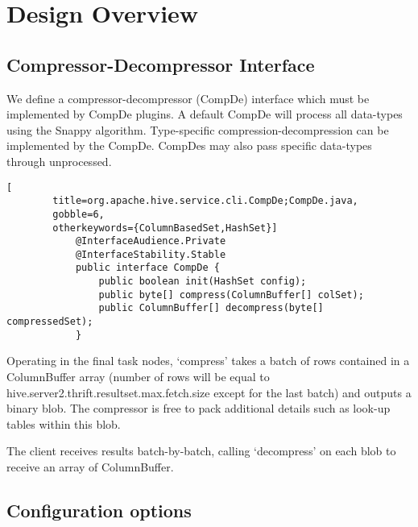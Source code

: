 \documentclass[11pt,a4paper]{article}
\begin{document}
\section{Design Overview}

	\subsection{Compressor-Decompressor Interface}
		
		We define a compressor-decompressor (CompDe) interface which must be implemented by CompDe plugins.
		A default CompDe will process all data-types using the Snappy algorithm.
		Type-specific compression-decompression can be implemented by the CompDe.
		CompDes may also pass specific data-types through unprocessed.
		
		\begin{lstlisting}[
		title=org.apache.hive.service.cli.CompDe;CompDe.java,
		gobble=6,
		otherkeywords={ColumnBasedSet,HashSet}]
			@InterfaceAudience.Private
			@InterfaceStability.Stable
			public interface CompDe {
				public boolean init(HashSet config);
				public byte[] compress(ColumnBuffer[] colSet);
				public ColumnBuffer[] decompress(byte[] compressedSet);
			}
		\end{lstlisting}
		
		Operating in the final task nodes, `compress' takes a batch of rows contained in a ColumnBuffer array (number of rows will be equal to \linebreak hive.server2.thrift.resultset.max.fetch.size except for the last batch) and outputs a binary blob.
		The compressor is free to pack additional details such as look-up tables within this blob.
		
		The client receives results batch-by-batch, calling `decompress' on each blob to receive an array of ColumnBuffer.
		
	\subsection{Configuration options}
		
\end{document}

